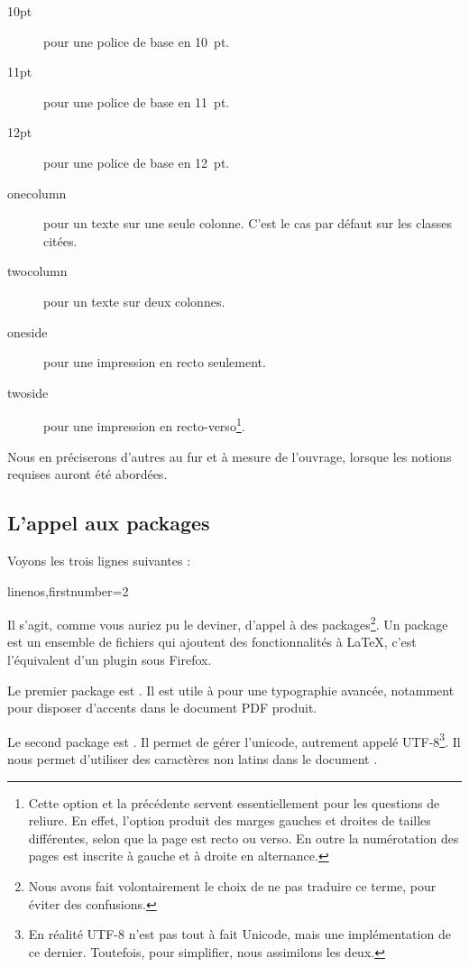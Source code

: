\begin{description}
\item[10pt] pour une police de base en 10~pt.
\item[11pt] pour une police de base en 11~pt.
\item[12pt] pour une police de base en 12~pt.
\item[onecolumn] pour un texte sur une seule colonne. C'est le cas par défaut sur les classes citées.
\item[twocolumn] pour un texte sur deux colonnes.
\item[oneside] pour une impression en recto seulement. \label{nbsides}
\item[twoside] pour une impression en recto-verso\footnote{Cette option et la précédente servent essentiellement pour les questions de reliure. En effet, l'option  produit des marges gauches et droites de tailles différentes, selon que la page est recto ou verso. En outre la numérotation des pages est inscrite à gauche et à droite  en alternance.}.\label{rectoverso}
\end{description}

Nous en préciserons d'autres au fur et à mesure de l'ouvrage, lorsque les notions requises auront été abordées.

\subsection{L'appel aux packages}

Voyons les trois lignes suivantes : 

\begin{latexcode*}{linenos,firstnumber=2}
\usepackage{fontspec}
\usepackage{xunicode}
\usepackage{polyglossia}
\end{latexcode*}

Il s'agit, comme vous auriez pu le deviner, d'appel à des packages\footnote{Nous avons fait volontairement le choix de ne pas traduire ce terme, pour éviter des confusions.}. Un package est un ensemble de fichiers qui ajoutent des fonctionnalités à \LaTeX, c'est l'équivalent d'un plugin sous Firefox. 

Le premier package est . Il est utile à \XeLaTeX  pour une typographie avancée, notamment pour disposer d'accents dans le document PDF produit. 

Le second package est . Il permet de gérer l'unicode, autrement appelé UTF-8\footnote{En réalité UTF-8 n'est pas tout à fait Unicode, mais une implémentation de ce dernier. Toutefois, pour simplifier, nous assimilons les deux.}. Il nous permet d'utiliser des caractères non latins dans le document .

